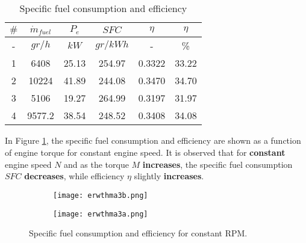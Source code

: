 \documentclass{report}
\begin{document}
\begin{table}[!h]
    \centering
    \renewcommand{\arraystretch}{1.2} 
    \begin{tabular}{|c|c|c|c|c|c|}
    \hline
    \rowcolor{blue}
    $\#$ & $\dot{m}_{fuel}$ & $P_e$ & $SFC$ & $\eta$ & $\eta$\\
    \hline
    \rowcolor{gray}
    - & $gr/h$ & $kW$ & $gr/kWh$ & - & \%\\
    \hline
    1 & 6408 & 25.13 & 254.97 & 0.3322 & 33.22\\
    \hline
    2 & 10224 & 41.89 & 244.08 & 0.3470 & 34.70\\
    \hline
    3 & 5106 & 19.27 & 264.99 & 0.3197 & 31.97\\
    \hline
    4 & 9577.2 & 38.54 & 248.52 & 0.3408 & 34.08\\
    \hline 
    \end{tabular}
    \caption{Specific fuel consumption and efficiency}
    \label{tab:finaltable3o}
\end{table}

In Figure \ref{fig:SFC/eta}, the specific fuel consumption and efficiency are shown as a function of engine torque for constant engine speed. It is observed that for \textbf{constant} engine speed $N$ and as the torque $M$ \textbf{increases}, the specific fuel consumption $SFC$ \textbf{decreases}, while efficiency $\eta$ slightly \textbf{increases}.

\begin{figure}[!h]
    \centering
    \begin{subfigure}[b]{.49\textwidth}
        \centering
        \texttt{[image: erwthma3b.png]}
    \end{subfigure}
    \hfill
    \begin{subfigure}[b]{.49\textwidth}
        \centering
        \texttt{[image: erwthma3a.png]}
    \end{subfigure}
    \caption{Specific fuel consumption and efficiency for constant RPM.}
    \label{fig:SFC/eta}
\end{figure}







 
\end{document}
